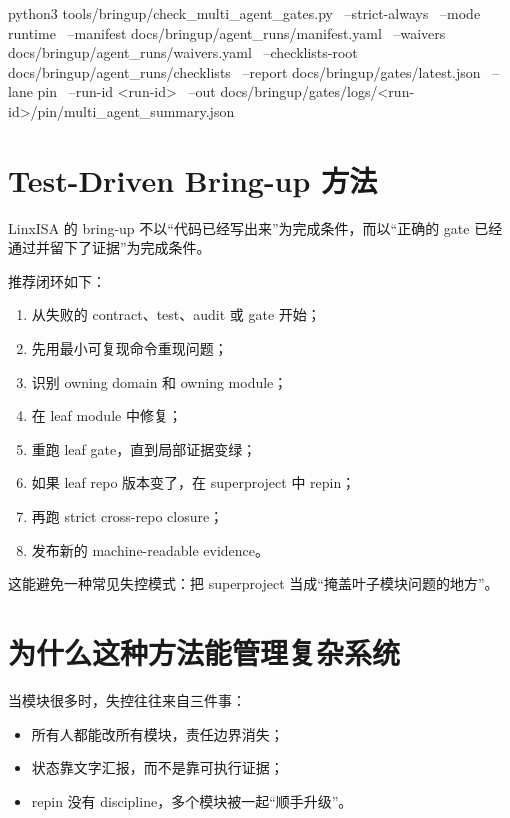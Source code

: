 \documentclass[UTF8,11pt,a4paper]{ctexart}
\begin{document}
\begin{CodeBlock}
python3 tools/bringup/check_multi_agent_gates.py \
  --strict-always \
  --mode runtime \
  --manifest docs/bringup/agent_runs/manifest.yaml \
  --waivers docs/bringup/agent_runs/waivers.yaml \
  --checklists-root docs/bringup/agent_runs/checklists \
  --report docs/bringup/gates/latest.json \
  --lane pin \
  --run-id <run-id> \
  --out docs/bringup/gates/logs/<run-id>/pin/multi_agent_summary.json
\end{CodeBlock}

\section{Test-Driven Bring-up 方法}

LinxISA 的 bring-up 不以“代码已经写出来”为完成条件，而以“正确的 gate 已经
通过并留下了证据”为完成条件。

推荐闭环如下：

\begin{enumerate}
  \item 从失败的 contract、test、audit 或 gate 开始；
  \item 先用最小可复现命令重现问题；
  \item 识别 owning domain 和 owning module；
  \item 在 leaf module 中修复；
  \item 重跑 leaf gate，直到局部证据变绿；
  \item 如果 leaf repo 版本变了，在 superproject 中 repin；
  \item 再跑 strict cross-repo closure；
  \item 发布新的 machine-readable evidence。
\end{enumerate}

这能避免一种常见失控模式：把 superproject 当成“掩盖叶子模块问题的地方”。

\section{为什么这种方法能管理复杂系统}

当模块很多时，失控往往来自三件事：

\begin{itemize}
  \item 所有人都能改所有模块，责任边界消失；
  \item 状态靠文字汇报，而不是靠可执行证据；
  \item repin 没有 discipline，多个模块被一起“顺手升级”。
\end{itemize}
\end{document}
